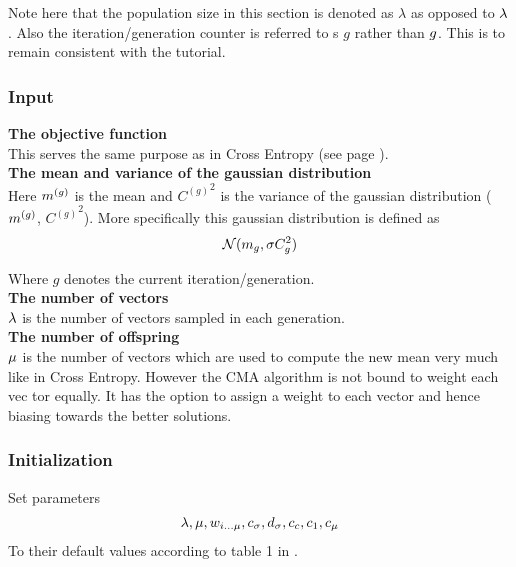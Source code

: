 Note here that the population size in this section is denoted as
$\lambda$ as opposed to $\lambda$. Also the iteration/generation 
counter is referred to s $g$ rather than $g$. 
This is to remain consistent 
with the tutorial.

\subsubsection{Input}

\textbf{The objective function} \\
This serves the same purpose as in Cross Entropy (see page \pageref{CEObjective}).
\\

\textbf{The mean and variance of the gaussian distribution} \\
Here $m^{(g)}$ is the mean and  
${C^{(g)}}^{2}$ is the variance 
of the gaussian distribution ($m^{(g)}$,
${C^{(g)}}^2$). 
More specifically this gaussian distribution is defined as 
\begin{align}
\mathcal{N}(m_{g},\sigma C^2_{g})
\end{align}

Where $g$ denotes the current iteration/generation.\\


\textbf{The number of vectors}\\
$\lambda$ is the number of vectors sampled in each generation.
\\

\textbf{The number of offspring}\\
$\mu$ is the number of vectors which are used to compute 
the new mean very much like in Cross Entropy. However the CMA algorithm
is not bound to weight each vec tor equally. It has the option to assign 
a weight to each vector and hence biasing towards the better solutions.
\\


\subsubsection{Initialization}


Set parameters
\begin{align}
\lambda, \mu, w_{i \dots \mu}, c_{\sigma}, d_{\sigma}, c_c, c_1, c_{\mu}
\end{align}
To their default values according to table 1 in \citep{hansen2011}.

